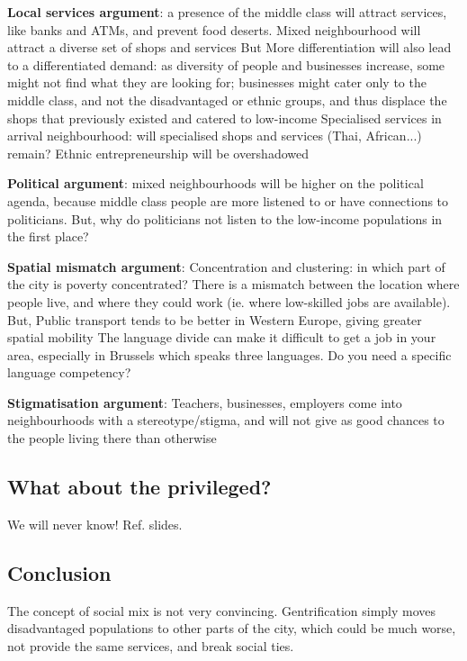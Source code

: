 \documentclass{article}
\begin{document}
\begin{outline}
	\1 \textbf{Local services argument}: a presence of the middle class will attract services, like banks and ATMs, and prevent food deserts. Mixed neighbourhood will attract a diverse set of shops and services
		\2 But
			\3 More differentiation will also lead to a differentiated demand: as diversity of people and businesses increase, some might not find what they are looking for; businesses might cater only to the middle class, and not the disadvantaged or ethnic groups, and thus displace the shops that previously existed and catered to low-income
			\3 Specialised services in arrival neighbourhood: will specialised shops and services (Thai, African...) remain?
			\3 Ethnic entrepreneurship will be overshadowed

	\1 \textbf{Political argument}: mixed neighbourhoods will be higher on the political agenda, because middle class people are more listened to or have connections to politicians. 
		\2 But, why do politicians not listen to the low-income populations in the first place?

	\1 \textbf{Spatial mismatch argument}: 
		\2 Concentration and clustering: in which part of the city is poverty concentrated? There is a mismatch between the location where people live, and where they could work (ie. where low-skilled jobs are available). 
		\2 But,
			\3 Public transport tends to be better in Western Europe, giving greater spatial mobility
			\3 The language divide can make it difficult to get a job in your area, especially in Brussels which speaks three languages. Do you need a specific language competency?
	
	\1 \textbf{Stigmatisation argument}: Teachers, businesses, employers come into neighbourhoods with a stereotype/stigma, and will not give as good chances to the people living there than otherwise
\end{outline}

\subsection{What about the privileged?}

We will never know! Ref. slides.

\subsection{Conclusion}

The concept of social mix is not very convincing. Gentrification simply moves disadvantaged populations to other parts of the city, which could be much worse, not provide the same services, and break social ties. 
\end{document}
